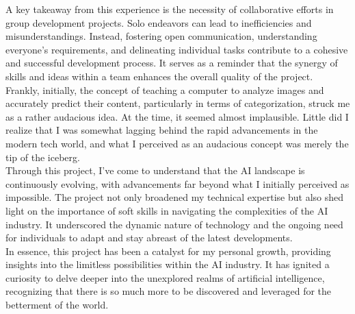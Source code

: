 \documentclass[conference]{IEEEtran}
\begin{document}
A key takeaway from this experience is the necessity of collaborative efforts in group development projects. Solo endeavors can lead to inefficiencies and misunderstandings. Instead, fostering open communication, understanding everyone's requirements, and delineating individual tasks contribute to a cohesive and successful development process. It serves as a reminder that the synergy of skills and ideas within a team enhances the overall quality of the project.\\

Frankly, initially, the concept of teaching a computer to analyze images and accurately predict their content, particularly in terms of categorization, struck me as a rather audacious idea. At the time, it seemed almost implausible. Little did I realize that I was somewhat lagging behind the rapid advancements in the modern tech world, and what I perceived as an audacious concept was merely the tip of the iceberg.\\

Through this project, I've come to understand that the AI landscape is continuously evolving, with advancements far beyond what I initially perceived as impossible. The project not only broadened my technical expertise but also shed light on the importance of soft skills in navigating the complexities of the AI industry. It underscored the dynamic nature of technology and the ongoing need for individuals to adapt and stay abreast of the latest developments.\\

In essence, this project has been a catalyst for my personal growth, providing insights into the limitless possibilities within the AI industry. It has ignited a curiosity to delve deeper into the unexplored realms of artificial intelligence, recognizing that there is so much more to be discovered and leveraged for the betterment of the world.\\
\end{document}

